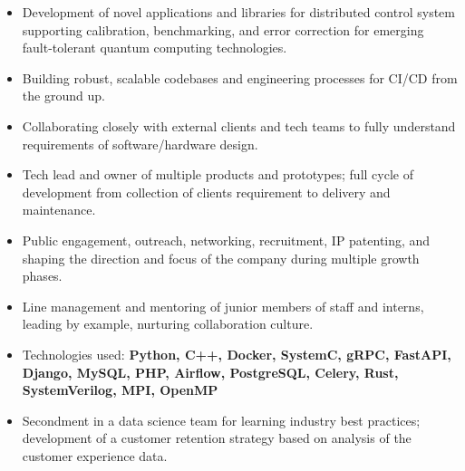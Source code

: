 \documentclass[10pt,a4paper,ragged2e,withhyper]{altacv}
\begin{document}
\begin{paracol}{2}
\begin{itemize}
    \item Development of novel applications and libraries for
    distributed control system supporting calibration, benchmarking,
    and error correction for emerging fault-tolerant quantum computing
    technologies.

    \item Building robust, scalable codebases and engineering processes for
    CI/CD from the ground up.

    \item Collaborating closely with external clients and tech teams to fully
    understand requirements of software/hardware design.

    \item Tech lead and owner of multiple products and prototypes;
    full cycle of development from collection of clients requirement to
    delivery and maintenance.

    \item Public engagement, outreach, networking, recruitment, IP patenting,
    and shaping the direction and focus of the company during multiple growth
    phases.

    \item Line management and mentoring of junior members of staff and interns,
    leading by example, nurturing collaboration culture.

    \item Technologies used:
    {\bf Python, C++, Docker, SystemC, gRPC, FastAPI, Django, MySQL, PHP,
    Airflow, PostgreSQL, Celery, Rust, SystemVerilog, MPI, OpenMP}
\end{itemize}

\divider



\begin{itemize}
    \item Secondment in a data science team for learning industry best
    practices;
    development of a customer retention strategy based on analysis of the
    customer experience data.
    

\end{itemize}
\end{paracol}
\end{document}
